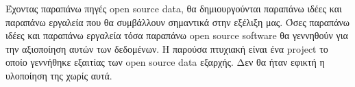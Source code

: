 Έχοντας παραπάνω πηγές open source data, θα δημιουργούνται παραπάνω ιδέες και παραπάνω εργαλεία που θα συμβάλλουν σημαντικά στην εξέλιξη μας. Όσες παραπάνω ιδέες και παραπάνω εργαλεία τόσα παραπάνω open source software θα γεννηθούν για την αξιοποίηση αυτών των δεδομένων. Η παρούσα πτυχιακή είναι ένα project το οποίο γεννήθηκε εξαιτίας των open source data εξαρχής. Δεν θα ήταν εφικτή η υλοποίηση της χωρίς αυτά. 